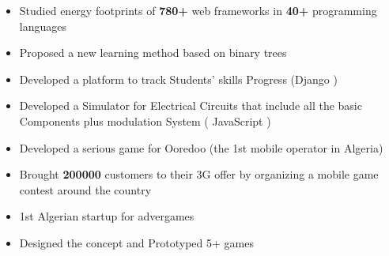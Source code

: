 \documentclass[10pt,a4paper,ragged2e,withhyper]{altacv}
\begin{document}
\begin{paracol}{2}
\begin{itemize}
    \item Studied energy footprints of \textbf{780+} web frameworks in \textbf{40+} programming languages
  \end{itemize}
  \divider
  \begin{itemize}
    \item Proposed a new learning method based on binary trees
    \item Developed a platform to track Students' skills Progress (Django )
    \item Developed a Simulator for Electrical Circuits that include all the basic Components plus modulation System ( JavaScript )
  \end{itemize}
  \divider
  \newpage
  \medskip
  \begin{itemize}
    \item Developed a serious game for Ooredoo (the 1st mobile operator in Algeria)
    \item Brought \textbf{200000} customers to their 3G offer by organizing a mobile game contest around the country
  \end{itemize}



  \begin{itemize}
    \item 1st Algerian startup for advergames
    \item Designed the concept and Prototyped 5+ games
  \end{itemize}



\end{paracol}
\end{document}
